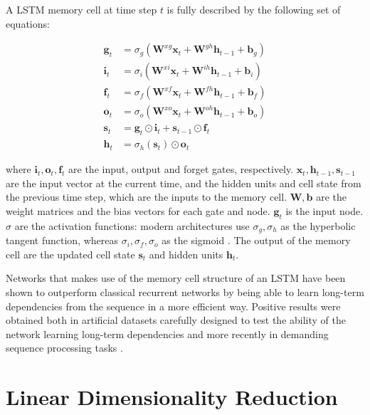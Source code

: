 \documentclass{kththesis}
\begin{document}
A LSTM memory cell at time step $t$ is fully described by the following set of equations:

\begin{equation}
\begin{aligned} 
\mathbf{g}_t &= \sigma_g(\mathbf{W}^{xg}\mathbf{x}_t + \mathbf{W}^{gh}\mathbf{h}_{t-1}+\mathbf{b}_g) \\ 
\mathbf{i}_t &= \sigma_i(\mathbf{W}^{xi}\mathbf{x}_t + \mathbf{W}^{ih}\mathbf{h}_{t-1}+\mathbf{b}_i) \\
\mathbf{f}_t &= \sigma_f(\mathbf{W}^{xf}\mathbf{x}_t + \mathbf{W}^{fh}\mathbf{h}_{t-1}+\mathbf{b}_f) \\
\mathbf{o}_t &= \sigma_o(\mathbf{W}^{xo}\mathbf{x}_t + \mathbf{W}^{oh}\mathbf{h}_{t-1}+\mathbf{b}_o) \\
\mathbf{s}_t &= \mathbf{g}_t \odot \mathbf{i}_t + \mathbf{s}_{t-1} \odot \mathbf{f}_t \\
\mathbf{h}_t &=  \sigma_h(\mathbf{s}_t) \odot \mathbf{o}_t
\end{aligned}
\end{equation}

where $\mathbf{i}_t, \mathbf{o}_t, \mathbf{f}_t$ are the input, output and forget gates, respectively. $\mathbf{x}_t, \mathbf{h}_{t-1}, \mathbf{s}_{t-1}$ are the input vector at the current time, and the hidden units and cell state from the previous time step, which are the inputs to the memory cell. $\mathbf{W}, \mathbf{b}$ are the weight matrices and the bias vectors for each gate and node. $\mathbf{g}_t$ is the input node. $\sigma$ are the activation functions: modern architectures use $\sigma_g,\sigma_h$ as the hyperbolic tangent function, whereas $\sigma_i,\sigma_f,\sigma_o$ as the sigmoid \citep{zaremba2014learning}. The output of the memory cell are the updated cell state $\mathbf{s}_t$ and hidden units $\mathbf{h}_t$.

Networks that makes use of the memory cell structure of an LSTM have been shown to outperform classical recurrent networks by being able to learn long-term dependencies from the sequence in a more efficient way. Positive results were obtained both in artificial datasets carefully designed to test the ability of the network learning long-term dependencies \citep{bengio1994learning} and more recently in demanding sequence processing tasks \citep{graves2013speech}\citep{sutskever2014sequence}.

\section{Linear Dimensionality Reduction}
\end{document}
